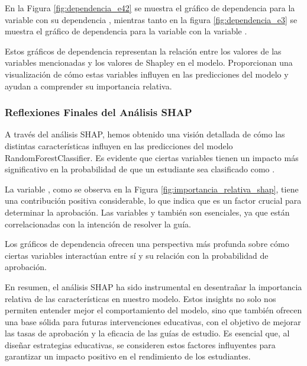 En la Figura \ref{fig:dependencia_e42} se muestra el gráfico de dependencia para la variable  con su dependencia , mientras tanto en la figura \ref{fig:dependencia_e3} se muestra el gráfico de dependencia para la variable  con la variable .

Estos gráficos de dependencia representan la relación entre los valores de las variables mencionadas y los valores de Shapley en el modelo. Proporcionan una visualización de cómo estas variables influyen en las predicciones del modelo y ayudan a comprender su importancia relativa.


\subsubsection{Reflexiones Finales del Análisis SHAP}

A través del análisis SHAP, hemos obtenido una visión detallada de cómo las distintas características influyen en las predicciones del modelo RandomForestClassifier. Es evidente que ciertas variables tienen un impacto más significativo en la probabilidad de que un estudiante sea clasificado como \textit{}.

La variable , como se observa en la Figura \ref{fig:importancia_relativa_shap}, tiene una contribución positiva considerable, lo que indica que es un factor crucial para determinar la aprobación. Las variables  y  también son esenciales, ya que están correlacionadas con la intención de resolver la guía.

Los gráficos de dependencia ofrecen una perspectiva más profunda sobre cómo ciertas variables interactúan entre sí y su relación con la probabilidad de aprobación.

En resumen, el análisis SHAP ha sido instrumental en desentrañar la importancia relativa de las características en nuestro modelo. Estos insights no solo nos permiten entender mejor el comportamiento del modelo, sino que también ofrecen una base sólida para futuras intervenciones educativas, con el objetivo de mejorar las tasas de aprobación y la eficacia de las guías de estudio. Es esencial que, al diseñar estrategias educativas, se consideren estos factores influyentes para garantizar un impacto positivo en el rendimiento de los estudiantes.